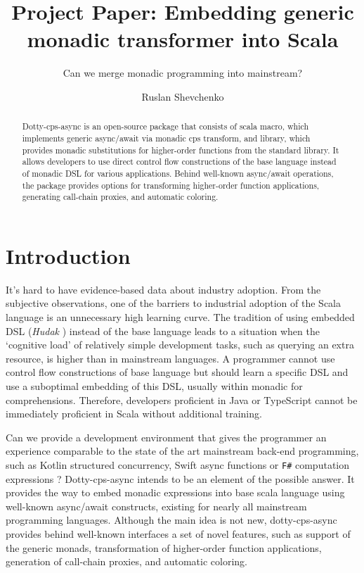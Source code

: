\documentclass{llncs}
\title{ Project Paper: Embedding generic monadic transformer into Scala }
\subtitle{ Can we merge monadic programming into mainstream? }
\author{ Ruslan Shevchenko 
 \orcidID{ 0000-0002-1554-2019 }
}
\institute{
  Institute of Software Systems \\
  of National Acedemy of Sciences of Ukraine\\
  \email{ ruslan@shevchenko.kiev.ua }
}
\begin{document}
\maketitle

\begin{abstract}
  Dotty-cps-async is an open-source package that consists of scala macro, which implements generic async/await via monadic cps transform, and library, which provides monadic substitutions for higher-order functions from the standard library. It allows developers to use direct control flow constructions of the base language instead of monadic DSL for various applications. Behind well-known async/await operations, the package provides options for transforming higher-order function applications, generating call-chain proxies, and automatic coloring.
\end{abstract}



\section{ Introduction }

  It's hard to have evidence-based data about industry adoption.  From the subjective observations,  one of the barriers to industrial adoption of the Scala language is an unnecessary high learning curve. 
 The tradition of using embedded DSL ({\it Hudak} \cite{10.1145/242224.242477}) instead of the base language leads to a situation when the ‘cognitive load’  of relatively simple development tasks, such as querying an extra resource, is higher than in mainstream languages. A programmer cannot use control flow constructions of base language but should learn a specific DSL and use a suboptimal embedding of this DSL, usually within monadic for comprehensions. Therefore, developers proficient in Java or TypeScript cannot be immediately proficient in Scala without additional training.

 Can we provide a development environment that gives the programmer an experience comparable to the state of the art mainstream back-end programming, such as Kotlin structured concurrency, Swift async functions or \verb|F#| computation expressions ? 
 Dotty-cps-async intends to be an element of the possible answer.  It provides the way to embed monadic expressions into base scala language using well-known async/await constructs, existing for nearly all mainstream programming languages.  Although the main idea is not new, dotty-cps-async provides behind well-known interfaces a set of novel features,  such as support of the generic monads, transformation of higher-order function applications, generation of call-chain proxies, and automatic coloring.   
\end{document}

